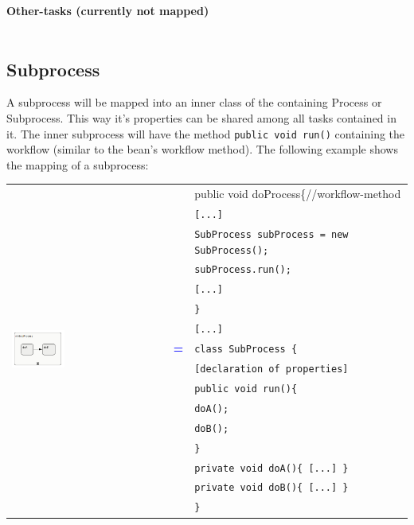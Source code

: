 \textbf{Other-tasks (currently not mapped)}
\\\\

\subsection{Subprocess}
A subprocess will be mapped into an inner class of the containing Process or Subprocess. This way it's properties can be shared among all tasks contained in it. The inner subprocess will have the method \texttt{public void run()} containing the workflow (similar to the bean's workflow method). The following example shows the mapping of a subprocess:\\

\begin{tabularx}{\linewidth}{lcX}
	\multirow{16}{*}{\includegraphics[width=0.35\textwidth]{images/mapping/subprocess.png}} &  &public void doProcess\{//workflow-method\\
	& & \texttt{\hspace{10pt}[...]}\\
	& & \texttt{\hspace{10pt}SubProcess subProcess = new SubProcess();}\\
	& & \texttt{\hspace{10pt}subProcess.run();}\\
	& & \texttt{\hspace{10pt}[...]}\\
	& & \texttt{\}}\\
	& & \texttt{[...]}\\
	& \textbf{\textcolor{blue}{=}} & \texttt{class SubProcess \{}\\
	& & \texttt{\hspace{10pt}[declaration of properties]}\\
	& & \texttt{\hspace{10pt}public void run()\{}\\
	& & \texttt{\hspace{20pt}doA();}\\
	& & \texttt{\hspace{20pt}doB();}\\
	& & \texttt{\hspace{10pt}\}}\\
	& & \texttt{\hspace{10pt}private void doA()\{ [...] \}}\\
	& & \texttt{\hspace{10pt}private void doB()\{ [...] \}}\\
	& & \texttt{\}}\\
\end{tabularx}\\

